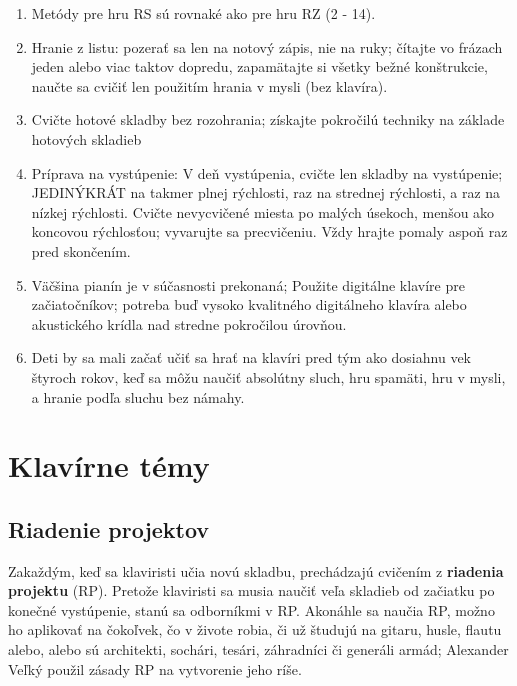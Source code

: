 \documentclass[11pt,a4paper]{book}
\begin{document}
\begin{enumerate}
\item Metódy pre hru RS sú rovnaké ako pre hru RZ (2 - 14).

\item Hranie z listu: pozerať sa len na notový zápis, nie na ruky; čítajte vo frázach jeden alebo viac taktov dopredu, zapamätajte si všetky bežné konštrukcie, naučte sa cvičiť len použitím hrania v mysli (bez klavíra).

\item Cvičte hotové skladby bez rozohrania; získajte pokročilú techniky na základe hotových skladieb

\item Príprava na vystúpenie: V deň vystúpenia, cvičte len skladby na vystúpenie; JEDINÝKRÁT na takmer plnej rýchlosti, raz na strednej rýchlosti, a raz na nízkej rýchlosti. Cvičte nevycvičené miesta po malých úsekoch, menšou ako koncovou rýchlosťou; vyvarujte sa precvičeniu. Vždy hrajte pomaly aspoň raz pred skončením.

\item Väčšina pianín je v súčasnosti prekonaná; Použite digitálne klavíre pre začiatočníkov; potreba buď vysoko kvalitného digitálneho klavíra alebo akustického krídla nad stredne pokročilou úrovňou.

\item Deti by sa mali začať učiť sa hrať na klavíri pred tým ako dosiahnu vek štyroch rokov, keď sa môžu naučiť absolútny sluch, hru spamäti, hru v mysli, a hranie podľa sluchu bez námahy.
\end{enumerate}

\chapter{Klavírne témy}\label{s:piano-topics}

\section{Riadenie projektov}\label{s:project-management}
Zakaždým, keď sa klaviristi učia novú skladbu, prechádzajú cvičením z \textbf{riadenia projektu} (RP). Pretože klaviristi sa musia naučiť veľa skladieb od začiatku po konečné vystúpenie, stanú sa odborníkmi v RP. Akonáhle sa naučia RP, možno ho aplikovať na čokoľvek, čo v živote robia, či už študujú na gitaru, husle, flautu alebo, alebo sú architekti, sochári, tesári, záhradníci či generáli armád; Alexander Veľký použil zásady RP na vytvorenie jeho ríše.
\end{document}
